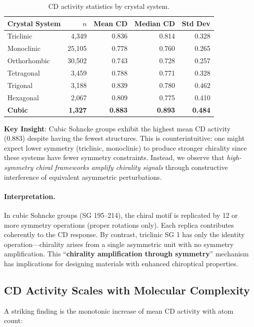 \documentclass[11pt,a4paper]{article}
\begin{document}
\begin{table}[H]
\centering
\caption{CD activity statistics by crystal system.}
\label{tab:cd}
\begin{tabular}{lrrrr}
\toprule
Crystal System & $n$ & Mean CD & Median CD & Std Dev \\
\midrule
Triclinic & 4,349 & 0.836 & 0.814 & 0.328 \\
Monoclinic & 25,105 & 0.778 & 0.760 & 0.265 \\
Orthorhombic & 30,502 & 0.743 & 0.728 & 0.257 \\
Tetragonal & 3,459 & 0.788 & 0.771 & 0.328 \\
Trigonal & 3,188 & 0.839 & 0.780 & 0.462 \\
Hexagonal & 2,067 & 0.809 & 0.775 & 0.410 \\
\textbf{Cubic} & \textbf{1,327} & \textbf{0.883} & \textbf{0.893} & \textbf{0.484} \\
\bottomrule
\end{tabular}
\end{table}

\noindent\textbf{Key Insight}: Cubic Sohncke groups exhibit the highest mean CD activity (0.883) despite having the fewest structures. This is counterintuitive: one might expect lower symmetry (triclinic, monoclinic) to produce stronger chirality since these systems have fewer symmetry constraints. Instead, we observe that \emph{high-symmetry chiral frameworks amplify chirality signals} through constructive interference of equivalent asymmetric perturbations.

\paragraph{Interpretation.} In cubic Sohncke groups (SG 195--214), the chiral motif is replicated by 12 or more symmetry operations (proper rotations only). Each replica contributes coherently to the CD response. By contrast, triclinic SG 1 has only the identity operation---chirality arises from a single asymmetric unit with no symmetry amplification. This ``\textbf{chirality amplification through symmetry}'' mechanism has implications for designing materials with enhanced chiroptical properties.

\subsection{CD Activity Scales with Molecular Complexity}

A striking finding is the monotonic increase of mean CD activity with atom count:
\end{document}
